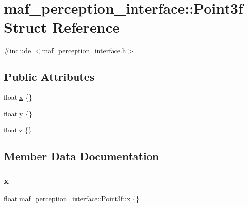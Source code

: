 \hypertarget{structmaf__perception__interface_1_1Point3f}{}\section{maf\+\_\+perception\+\_\+interface\+:\+:Point3f Struct Reference}
\label{structmaf__perception__interface_1_1Point3f}


{\ttfamily \#include $<$maf\+\_\+perception\+\_\+interface.\+h$>$}

\subsection*{Public Attributes}
\begin{DoxyCompactItemize}
\item 
float \hyperlink{structmaf__perception__interface_1_1Point3f_ad165f116d47d5d3e82c3fca86458fe78}{x} \{\}
\item 
float \hyperlink{structmaf__perception__interface_1_1Point3f_afdd5305472c964b9f9b177e2ef89ed9e}{y} \{\}
\item 
float \hyperlink{structmaf__perception__interface_1_1Point3f_ad31fcb8cf52d50dcf8cfe3a07d979f92}{z} \{\}
\end{DoxyCompactItemize}


\subsection{Member Data Documentation}
\mbox{\label{structmaf__perception__interface_1_1Point3f_ad165f116d47d5d3e82c3fca86458fe78}} 
\subsubsection{\texorpdfstring{x}{x}}
{\footnotesize\ttfamily float maf\+\_\+perception\+\_\+interface\+::\+Point3f\+::x \{\}}

\mbox{\label{structmaf__perception__interface_1_1Point3f_afdd5305472c964b9f9b177e2ef89ed9e}} 
